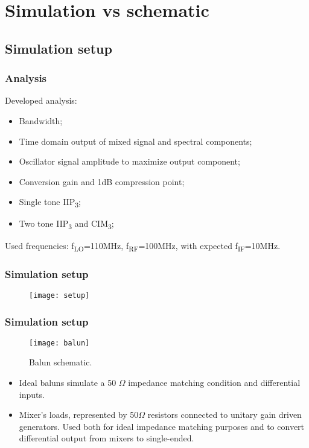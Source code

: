 \section{Simulation vs schematic}
\subsection{Simulation setup}

\begin{frame}
	\tableofcontents[currentsubsection]
\end{frame}

\begin{frame}
\frametitle{Analysis}
	Developed analysis:
	\begin{itemize}
		\item Bandwidth;
		\item Time domain output of mixed signal and spectral components;
			\item Oscillator signal amplitude to maximize output component;
		\item Conversion gain and 1dB compression point;
		\item Single tone IIP\textsubscript{3};
		\item Two tone IIP\textsubscript{3} and CIM\textsubscript{3};
	\end{itemize}
	Used frequencies: f\textsubscript{LO}=110MHz, f\textsubscript{RF}=100MHz, with expected f\textsubscript{IF}=10MHz.
\end{frame}

\begin{frame}
	\frametitle{Simulation setup}
	\begin{figure}[H]
		\centering
		\texttt{[image: setup]}
		\label{fig:setup}
	\end{figure}
\end{frame}

\begin{frame}
	\frametitle{Simulation setup}
	\begin{figure}[H]
		\centering
		\texttt{[image: balun]}
		\caption{Balun schematic.}
		\label{fig:balun}
	\end{figure}
	\begin{itemize}
		\item Ideal baluns simulate a  50 \(\Omega\) impedance matching condition and differential inputs. 
		\item Mixer's loads, represented by 50\(\Omega\) resistors connected to unitary gain driven generators. Used both for ideal impedance matching purposes and to convert differential output from mixers to single-ended.
	\end{itemize}
\end{frame}

